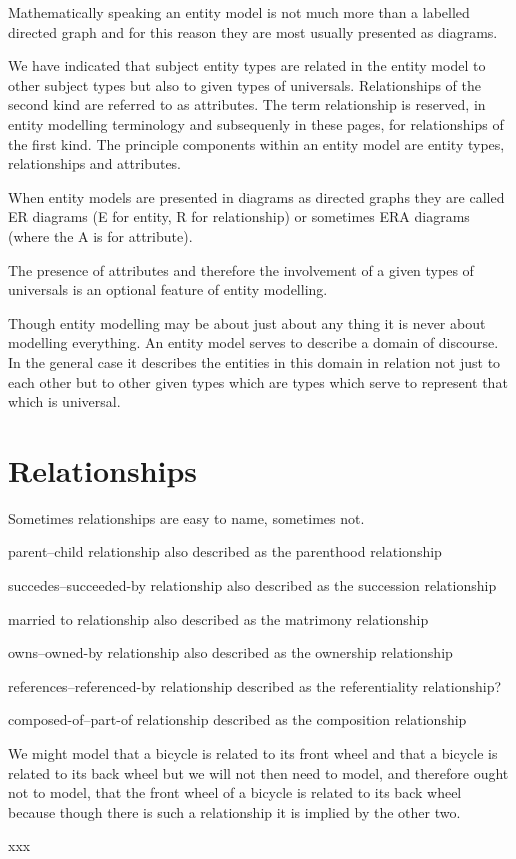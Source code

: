 \mynote Mathematically speaking an entity model is not much more than a labelled directed graph and for this reason they are most usually presented as diagrams.

\mynote We have indicated that subject entity types are related in the entity model to 
other subject types but also to given types of universals. 
Relationships of the second kind are referred to as attributes. The term relationship is reserved, in entity modelling terminology and subsequenly in these pages, for relationships of the first kind.  The principle components within an entity model are entity types, relationships  and attributes. 

\mynote When entity models are presented in diagrams as directed graphs
they are called ER diagrams (E for entity, R for relationship) or sometimes
ERA diagrams (where the A is for attribute). 

\mynote
The presence of attributes and therefore the involvement of a given types of universals
is an optional feature of entity modelling. 

\mynote Though entity modelling may be about just about any thing it is never about modelling everything.
An entity model serves to describe a domain of discourse. In the general case it describes the entities in this domain in relation not just to each other but to other given types which are types which serve to represent that which is universal. 


\mynote  
 
\section{Relationships}

\mynote Sometimes relationships are easy to name, sometimes not. 

\mynote 

parent--child relationship also described as the parenthood relationship

succedes--succeeded-by relationship also described as the succession relationship

married to relationship also described as the matrimony relationship

owns--owned-by relationship also described as the ownership relationship

references--referenced-by relationship described as the referentiality relationship?

composed-of--part-of relationship described as the composition relationship


\mynote We might model that a bicycle is related to its front wheel and that a bicycle is related to its back wheel but we will not then need to model,  and therefore ought not to model, that the front wheel of a bicycle is related to its back wheel because though there is such a relationship it is implied by the other two.  

\mynote xxx
  
  